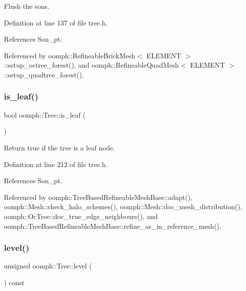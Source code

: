 Flush the sons. 



Definition at line 137 of file tree.\+h.



References Son\+\_\+pt.



Referenced by oomph\+::\+Refineable\+Brick\+Mesh$<$ E\+L\+E\+M\+E\+N\+T $>$\+::setup\+\_\+octree\+\_\+forest(), and oomph\+::\+Refineable\+Quad\+Mesh$<$ E\+L\+E\+M\+E\+N\+T $>$\+::setup\+\_\+quadtree\+\_\+forest().

\mbox{\label{classoomph_1_1Tree_a72000456c76880e3f78f8f8fb43d49d8}} 
\subsubsection{\texorpdfstring{is\+\_\+leaf()}{is\_leaf()}}
{\footnotesize\ttfamily bool oomph\+::\+Tree\+::is\+\_\+leaf (\begin{DoxyParamCaption}{ }\end{DoxyParamCaption})\hspace{0.3cm}{\ttfamily [inline]}}



Return true if the tree is a leaf node. 



Definition at line 212 of file tree.\+h.



References Son\+\_\+pt.



Referenced by oomph\+::\+Tree\+Based\+Refineable\+Mesh\+Base\+::adapt(), oomph\+::\+Mesh\+::check\+\_\+halo\+\_\+schemes(), oomph\+::\+Mesh\+::doc\+\_\+mesh\+\_\+distribution(), oomph\+::\+Oc\+Tree\+::doc\+\_\+true\+\_\+edge\+\_\+neighbours(), and oomph\+::\+Tree\+Based\+Refineable\+Mesh\+Base\+::refine\+\_\+as\+\_\+in\+\_\+reference\+\_\+mesh().

\mbox{\label{classoomph_1_1Tree_ab3eba84432fcc595684ac7eb8331b8ee}} 
\subsubsection{\texorpdfstring{level()}{level()}}
{\footnotesize\ttfamily unsigned oomph\+::\+Tree\+::level (\begin{DoxyParamCaption}{ }\end{DoxyParamCaption}) const\hspace{0.3cm}{\ttfamily [inline]}}



